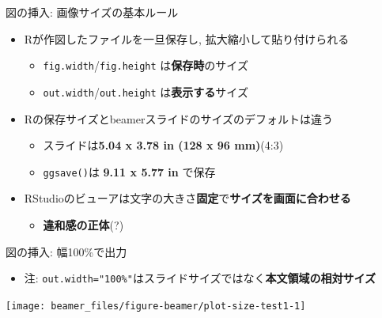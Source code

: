 \documentclass[
  12pt,
  ignorenonframetext,
]{beamer}
\providecommand{\tightlist}{%
  \setlength{\itemsep}{0pt}\setlength{\parskip}{0pt}}
\begin{document}
\begin{frame}[fragile]{図の挿入: 画像サイズの基本ルール}
\protect\hypertarget{ux56f3ux306eux633fux5165-ux753bux50cfux30b5ux30a4ux30baux306eux57faux672cux30ebux30fcux30eb}{}

\begin{itemize}
\tightlist
\item
  Rが作図したファイルを一旦保存し, 拡大縮小して貼り付けられる

  \begin{itemize}
  \tightlist
  \item
    \texttt{fig.width}/\texttt{fig.height} は\textbf{保存時}のサイズ
  \item
    \texttt{out.width}/\texttt{out.height} は\textbf{表示する}サイズ
  \end{itemize}
\item
  Rの保存サイズとbeamerスライドのサイズのデフォルトは違う

  \begin{itemize}
  \tightlist
  \item
    スライドは\textbf{5.04 x 3.78 in (128 x 96 mm)}(4:3)
  \item
    \texttt{ggsave()}は \textbf{9.11 x 5.77 in} で保存
  \end{itemize}
\item
  RStudioのビューアは文字の大きさ\textbf{固定}で\textbf{サイズを画面に合わせる}

  \begin{itemize}
  \tightlist
  \item
    \textbf{違和感の正体}(?)
  \end{itemize}
\end{itemize}

\end{frame}

\begin{frame}[fragile]{図の挿入: 幅100\%で出力}
\protect\hypertarget{ux56f3ux306eux633fux5165-ux5e45100ux3067ux51faux529b}{}

\begin{itemize}
\tightlist
\item
  注:
  \texttt{out.width="100\%"}はスライドサイズではなく\textbf{本文領域の相対サイズ}
\end{itemize}

\begin{center}\texttt{[image: beamer\_files/figure-beamer/plot-size-test1-1]} \end{center}

\end{frame}
\end{document}
